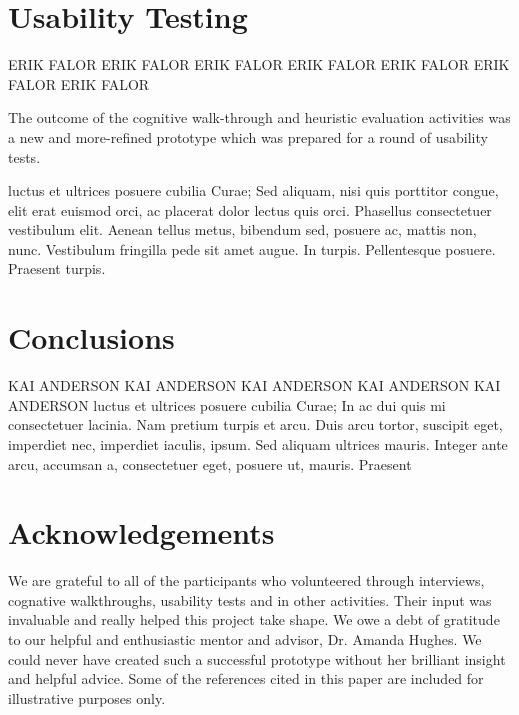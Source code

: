 \documentclass{sigchi-ext}
\begin{document}
\section{Usability Testing}

ERIK FALOR ERIK FALOR ERIK FALOR ERIK FALOR ERIK FALOR ERIK FALOR ERIK FALOR

The outcome of the cognitive walk-through and heuristic evaluation activities was a new and
more-refined prototype which was prepared for a round of usability tests.


luctus et ultrices posuere cubilia Curae; Sed aliquam, nisi quis
porttitor congue, elit erat euismod orci, ac placerat dolor lectus quis
orci. Phasellus consectetuer vestibulum elit. Aenean tellus metus,
bibendum sed, posuere ac, mattis non, nunc. Vestibulum fringilla pede
sit amet augue. In turpis. Pellentesque posuere. Praesent turpis.



\section{Conclusions}
KAI ANDERSON KAI ANDERSON KAI ANDERSON KAI ANDERSON KAI ANDERSON
luctus et ultrices posuere cubilia Curae; In ac dui quis mi
consectetuer lacinia.
Nam pretium turpis et arcu. Duis arcu tortor, suscipit eget, imperdiet
nec, imperdiet iaculis, ipsum. Sed aliquam ultrices mauris. Integer
ante arcu, accumsan a, consectetuer eget, posuere ut, mauris. Praesent



\section{Acknowledgements}
We are grateful to all of the participants who volunteered through interviews,
cognative walkthroughs, usability tests and in other activities. Their input
was invaluable and really helped this project take shape.
We owe a debt of gratitude to our helpful and enthusiastic mentor and advisor,
Dr. Amanda Hughes. We could never have created such a successful prototype
without her brilliant insight and helpful advice.
Some of the references cited in this paper are included for illustrative purposes only.



\balance{}

% 

% 

\end{document}
